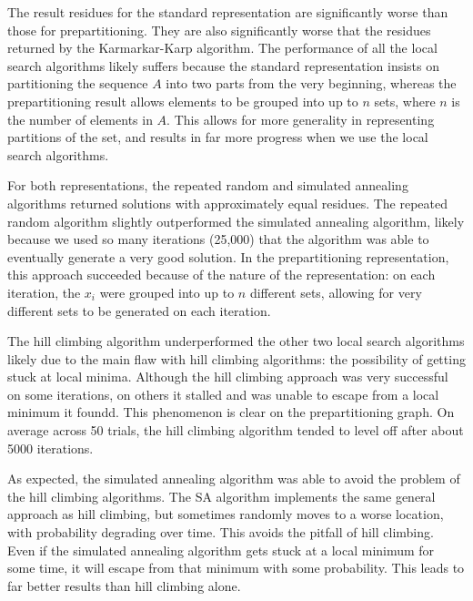 \documentclass[solution, letterpaper]{cs121}
\begin{document}
The result residues for the standard representation are significantly worse than those for prepartitioning. They are also significantly worse that the residues returned by the Karmarkar-Karp algorithm. The performance of all the local search algorithms likely suffers because the standard representation insists on partitioning the sequence $A$ into two parts from the very beginning, whereas the prepartitioning result allows elements to be grouped into up to $n$ sets, where $n$ is the number of elements in $A$. This allows for more generality in representing partitions of the set, and results in far more progress when we use the local search algorithms.

For both representations, the repeated random and simulated annealing algorithms returned solutions with approximately equal residues. The repeated random algorithm slightly outperformed the simulated annealing algorithm, likely because we used so many iterations (25,000) that the algorithm was able to eventually generate a very good solution. In the prepartitioning representation, this approach succeeded because of the nature of the representation: on each iteration, the $x_i$ were grouped into up to $n$ different sets, allowing for very different sets to be generated on each iteration. 

The hill climbing algorithm underperformed the other two local search algorithms likely due to the main flaw with hill climbing algorithms: the possibility of getting stuck at local minima. Although the hill climbing approach was very successful on some iterations, on others it stalled and was unable to escape from a local minimum it foundd. This phenomenon is clear on the prepartitioning graph. On average across 50 trials, the hill climbing algorithm tended to level off after about 5000 iterations.

As expected, the simulated annealing algorithm was able to avoid the problem of the hill climbing algorithms. The SA algorithm implements the same general approach as hill climbing, but sometimes randomly moves to a worse location, with probability degrading over time. This avoids the pitfall of hill climbing. Even if the simulated annealing algorithm gets stuck at a local minimum for some time, it will escape from that minimum with some probability. This leads to far better results than hill climbing alone.
\end{document}
